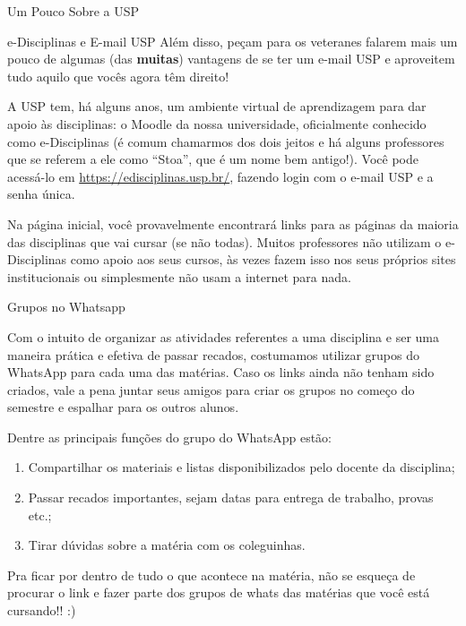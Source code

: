 \begin{secao}{Um Pouco Sobre a USP}
\begin{subsecao}{e-Disciplinas e E-mail USP}
Além disso, peçam para os veteranes falarem mais um pouco de algumas 
(das \textbf{muitas}) vantagens de se ter um e-mail USP e aproveitem tudo aquilo que 
vocês agora têm direito!

A USP tem, há alguns anos, um ambiente virtual de aprendizagem para dar apoio
às disciplinas: o Moodle da nossa universidade, oficialmente conhecido como
e-Disciplinas (é comum chamarmos dos dois jeitos e há alguns professores que
se referem a ele como ``Stoa'', que é um nome bem antigo!). Você pode acessá-lo em
\url{https://edisciplinas.usp.br/}, fazendo login com o e-mail USP e a senha única.

Na página inicial, você provavelmente encontrará links para as páginas da maioria
das disciplinas que vai cursar (se não todas). Muitos professores não utilizam o 
e-Disciplinas como apoio aos seus cursos, às vezes fazem isso nos seus próprios 
sites institucionais ou simplesmente não usam a internet para nada. 

\end{subsecao}

\begin{subsecao}{Grupos no Whatsapp}

Com o intuito de organizar as atividades referentes a uma disciplina e ser uma
maneira prática e efetiva de passar recados, costumamos utilizar grupos do WhatsApp
para cada uma das matérias. Caso os links ainda não tenham sido criados,
vale a pena juntar seus amigos para criar os grupos no começo do semestre e espalhar
para os outros alunos.

Dentre as principais funções do grupo do WhatsApp estão:

\begin{enumerate}
\item Compartilhar os materiais e listas disponibilizados pelo docente da disciplina;
\item Passar recados importantes, sejam datas para entrega de trabalho, provas etc.;
\item Tirar dúvidas sobre a matéria com os coleguinhas.
\end{enumerate}

Pra ficar por dentro de tudo o que acontece na matéria, não se esqueça de procurar o
link e fazer parte dos grupos de whats das matérias que você está cursando!! :)

\end{subsecao}


\end{secao}
